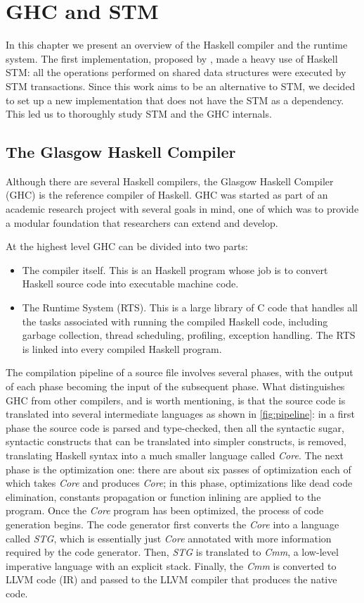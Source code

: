 
\chapter{GHC and STM}
\label{chap:ghc}

In this chapter we present an overview of the Haskell compiler and the runtime system.
The first implementation, proposed by \citet{Toneguzzo}, made a heavy use of Haskell STM: all the operations performed on shared data structures were executed by STM transactions. Since this work aims to be an alternative to STM, we decided to set up a new implementation that does not have the STM as a dependency. This led us to thoroughly study STM and the GHC internals.


\section{The Glasgow Haskell Compiler}
Although there are several Haskell compilers, the Glasgow Haskell Compiler (GHC) is the reference compiler of Haskell. GHC was started as part of an academic research project with several goals in mind, one of which was to provide a modular foundation that researchers can extend and develop.

At the highest level GHC can be divided into two parts:
\begin{itemize}
 \item The compiler itself. This is an Haskell program whose job is to convert Haskell source code into executable machine code.
 \item The Runtime System (RTS). This is a large library of C code that handles all the tasks associated with running the compiled Haskell code, including garbage collection, thread scheduling, profiling, exception handling. The RTS is linked into every compiled Haskell program.
 \end{itemize}
The compilation pipeline of a source file involves several phases, with the output of each phase becoming the input of the subsequent phase. What distinguishes GHC from other compilers, and is worth mentioning, is that the source code is translated into several intermediate languages as shown in \cref{fig:pipeline}: in a first phase the source code is parsed and type-checked, then all the syntactic sugar, \ie syntactic constructs that can be translated into simpler constructs, is removed, translating Haskell syntax into a much smaller language called \emph{Core}. The next phase is the optimization one: there are about six passes of optimization each of which takes \emph{Core} and produces \emph{Core}; in this phase, optimizations like dead code elimination, constants propagation or function inlining are applied to the program. Once the \emph{Core} program has been optimized, the process of code generation begins. The code generator first converts the \emph{Core} into a language called \emph{STG}, which is essentially just \emph{Core} annotated with more information required by the code generator. Then, \emph{STG} is translated to \emph{Cmm}, a low-level imperative language with an explicit stack. Finally, the \emph{Cmm} is converted to LLVM code (IR) and passed to the LLVM compiler that produces the native code.

